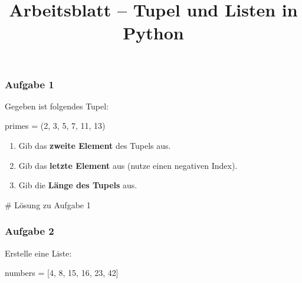 \documentclass[
  11pt,
  a4paper,
  DIV=11,
  numbers=noendperiod]{scrartcl}
\title{Arbeitsblatt -- Tupel und Listen in Python}
\author{}
\date{}
\newenvironment{Shaded}{\begin{snugshade}}{\end{snugshade}}
\newcommand{\CommentTok}[1]{\textcolor[rgb]{0.37,0.37,0.37}{#1}}
\newcommand{\DecValTok}[1]{\textcolor[rgb]{0.68,0.00,0.00}{#1}}
\newcommand{\NormalTok}[1]{\textcolor[rgb]{0.00,0.23,0.31}{#1}}
\newcommand{\OperatorTok}[1]{\textcolor[rgb]{0.37,0.37,0.37}{#1}}
\providecommand{\tightlist}{%
  \setlength{\itemsep}{0pt}\setlength{\parskip}{0pt}}
\begin{document}
\maketitle


\subsubsection{Aufgabe 1}\label{aufgabe-1}

Gegeben ist folgendes Tupel:

\begin{Shaded}
\begin{Highlighting}[numbers=left,,]
\NormalTok{primes }\OperatorTok{=}\NormalTok{ (}\DecValTok{2}\NormalTok{, }\DecValTok{3}\NormalTok{, }\DecValTok{5}\NormalTok{, }\DecValTok{7}\NormalTok{, }\DecValTok{11}\NormalTok{, }\DecValTok{13}\NormalTok{)}
\end{Highlighting}
\end{Shaded}

\begin{enumerate}
\def\labelenumi{\arabic{enumi}.}
\tightlist
\item
  Gib das \textbf{zweite Element} des Tupels aus.\\
\item
  Gib das \textbf{letzte Element} aus (nutze einen negativen Index).\\
\item
  Gib die \textbf{Länge des Tupels} aus.
\end{enumerate}

\begin{Shaded}
\begin{Highlighting}[numbers=left,,]
\CommentTok{\# Lösung zu Aufgabe 1}
\end{Highlighting}
\end{Shaded}

\subsubsection{Aufgabe 2}\label{aufgabe-2}

Erstelle eine Liste:

\begin{Shaded}
\begin{Highlighting}[numbers=left,,]
\NormalTok{numbers }\OperatorTok{=}\NormalTok{ [}\DecValTok{4}\NormalTok{, }\DecValTok{8}\NormalTok{, }\DecValTok{15}\NormalTok{, }\DecValTok{16}\NormalTok{, }\DecValTok{23}\NormalTok{, }\DecValTok{42}\NormalTok{]}
\end{Highlighting}
\end{Shaded}
\end{document}

